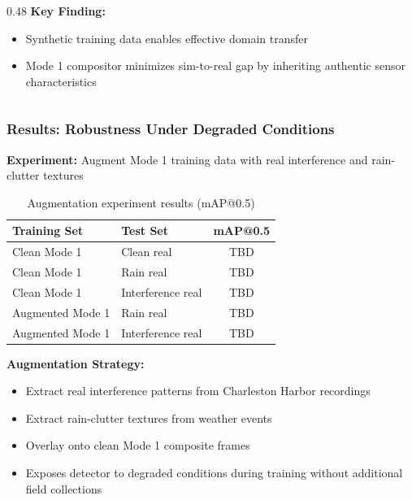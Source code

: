 \documentclass[aspectratio=169, 10pt]{beamer}
\begin{document}
\begin{frame}
\begin{columns}[T]
\begin{column}{0.48\textwidth}
      \vspace{0.3cm}
      \textbf{Key Finding:}
      \setlength{\itemsep}{0pt}
      \begin{itemize}
        \item Synthetic training data enables effective domain transfer
        \item Mode 1 compositor minimizes sim-to-real gap by inheriting authentic sensor characteristics
      \end{itemize}
    \end{column}
  \end{columns}
\end{frame}

\begin{frame}
  \frametitle{Results: Robustness Under Degraded Conditions}

  \small
  \textbf{Experiment:} Augment Mode 1 training data with real interference and rain-clutter textures

  \vspace{0.3cm}
  \begin{table}
    \centering
    \caption{Augmentation experiment results (mAP@0.5)}
    \scriptsize
    \begin{tabular}{@{}llc@{}}
      \toprule
      \textbf{Training Set} & \textbf{Test Set} & \textbf{mAP@0.5} \\
      \midrule
      Clean Mode 1 & Clean real & TBD \\
      Clean Mode 1 & Rain real & TBD \\
      Clean Mode 1 & Interference real & TBD \\
      \midrule
      Augmented Mode 1 & Rain real & TBD \\
      Augmented Mode 1 & Interference real & TBD \\
      \bottomrule
    \end{tabular}
  \end{table}

  \vspace{0.3cm}
  \textbf{Augmentation Strategy:}
  \setlength{\itemsep}{0pt}
  \begin{itemize}
    \item Extract real interference patterns from Charleston Harbor recordings
    \item Extract rain-clutter textures from weather events
    \item Overlay onto clean Mode 1 composite frames
    \item Exposes detector to degraded conditions during training without additional field collections
  \end{itemize}
\end{frame}
\end{document}
